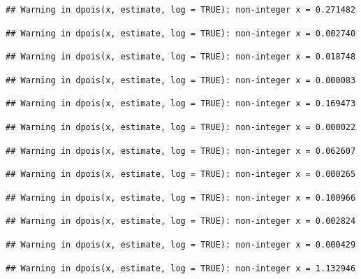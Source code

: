 \documentclass[]{article}
\begin{document}
\begin{verbatim}
## Warning in dpois(x, estimate, log = TRUE): non-integer x = 0.271482
\end{verbatim}

\begin{verbatim}
## Warning in dpois(x, estimate, log = TRUE): non-integer x = 0.002740
\end{verbatim}

\begin{verbatim}
## Warning in dpois(x, estimate, log = TRUE): non-integer x = 0.018748
\end{verbatim}

\begin{verbatim}
## Warning in dpois(x, estimate, log = TRUE): non-integer x = 0.000083
\end{verbatim}

\begin{verbatim}
## Warning in dpois(x, estimate, log = TRUE): non-integer x = 0.169473
\end{verbatim}

\begin{verbatim}
## Warning in dpois(x, estimate, log = TRUE): non-integer x = 0.000022
\end{verbatim}

\begin{verbatim}
## Warning in dpois(x, estimate, log = TRUE): non-integer x = 0.062607
\end{verbatim}

\begin{verbatim}
## Warning in dpois(x, estimate, log = TRUE): non-integer x = 0.000265
\end{verbatim}

\begin{verbatim}
## Warning in dpois(x, estimate, log = TRUE): non-integer x = 0.100966
\end{verbatim}

\begin{verbatim}
## Warning in dpois(x, estimate, log = TRUE): non-integer x = 0.002824
\end{verbatim}

\begin{verbatim}
## Warning in dpois(x, estimate, log = TRUE): non-integer x = 0.000429
\end{verbatim}

\begin{verbatim}
## Warning in dpois(x, estimate, log = TRUE): non-integer x = 1.132946
\end{verbatim}
\end{document}
